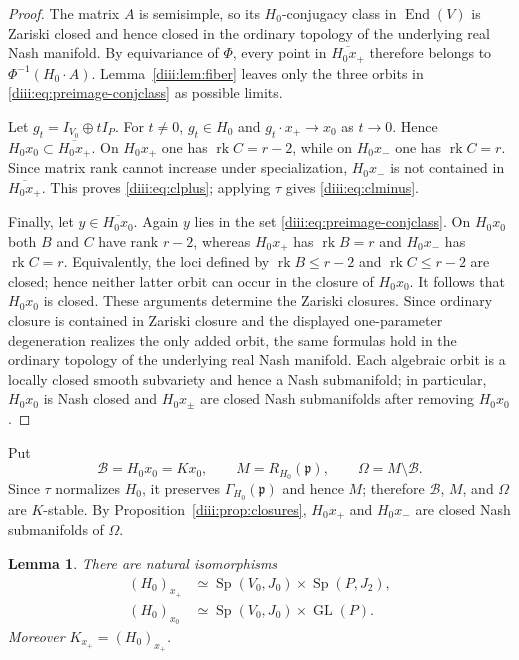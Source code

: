 \documentclass[10pt,a4paper]{amsart}
\numberwithin{equation}{section}
\newtheorem{lemma}[theorem]{Lemma}
\newcommand{\GL}{\operatorname{GL}}
\newcommand{\Sp}{\operatorname{Sp}}
\newcommand{\End}{\operatorname{End}}
\newcommand{\rk}{\operatorname{rk}}
\newcommand{\fp}{\mathfrak p}
\begin{document}
\begin{proof}
The matrix $A$ is semisimple, so its $H_0$-conjugacy class in $\End(V)$ is Zariski closed and hence closed in the ordinary topology of the underlying real Nash manifold.  By equivariance of $\Phi$, every point in
$\overline{H_0x_+}$ therefore belongs to $\Phi^{-1}(H_0\cdot A)$.
Lemma~\ref{diii:lem:fiber} leaves only the three orbits in
\eqref{diii:eq:preimage-conjclass} as possible limits.

Let $g_t=I_{V_0}\oplus tI_P$.  For $t\ne0$, $g_t\in H_0$ and
$g_t\cdot x_+\to x_0$ as $t\to0$.  Hence
$H_0x_0\subset\overline{H_0x_+}$.  On $H_0x_+$ one has
$\rk C=r-2$, while on $H_0x_-$ one has $\rk C=r$.  Since matrix rank cannot increase under specialization, $H_0x_-$ is not contained in
$\overline{H_0x_+}$.  This proves \eqref{diii:eq:clplus}; applying $\tau$ gives \eqref{diii:eq:clminus}.

Finally, let $y\in\overline{H_0x_0}$.  Again $y$ lies in the set
\eqref{diii:eq:preimage-conjclass}.  On $H_0x_0$ both $B$ and $C$ have rank
$r-2$, whereas $H_0x_+$ has $\rk B=r$ and $H_0x_-$ has $\rk C=r$.
Equivalently, the loci defined by $\rk B\le r-2$ and $\rk C\le r-2$ are closed; hence neither latter orbit can occur in the closure of $H_0x_0$.  It follows that $H_0x_0$ is closed.  These arguments determine the Zariski closures.  Since ordinary closure is
contained in Zariski closure and the displayed one-parameter degeneration
realizes the only added orbit, the same formulas hold in the ordinary topology
of the underlying real Nash manifold.  Each algebraic orbit is a locally closed
smooth subvariety and hence a Nash submanifold; in particular, $H_0x_0$ is Nash
closed and $H_0x_\pm$ are closed Nash submanifolds after removing $H_0x_0$.
\end{proof}

Put
\[
  \mathcal B=H_0x_0=Kx_0,
  \qquad
  M=R_{H_0}(\fp),
  \qquad
  \Omega=M\setminus\mathcal B.
\]
Since $\tau$ normalizes $H_0$, it preserves $\Gamma_{H_0}(\fp)$ and hence $M$; therefore $\mathcal B$, $M$, and $\Omega$ are $K$-stable.  By Proposition~\ref{diii:prop:closures}, $H_0x_+$ and $H_0x_-$ are closed Nash submanifolds of $\Omega$.

\begin{lemma}\label{diii:lem:stabilizers}
There are natural isomorphisms
\begin{align}
 (H_0)_{x_+}&\simeq \Sp(V_0,J_0)\times\Sp(P,J_2),\label{diii:eq:stabplus}\\
 (H_0)_{x_0}&\simeq \Sp(V_0,J_0)\times\GL(P).\label{diii:eq:stabzero}
\end{align}
Moreover $K_{x_+}=(H_0)_{x_+}$.
\end{lemma}
\end{document}
